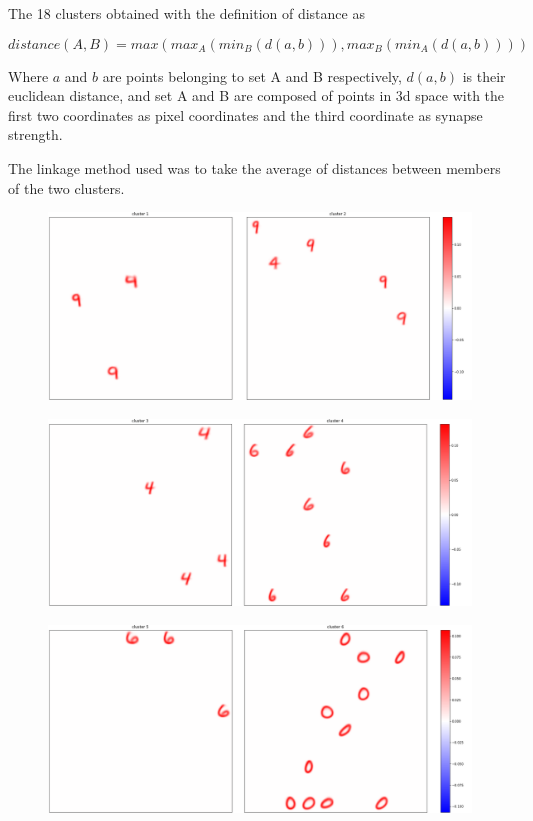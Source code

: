 \documentclass[a4paper]{report}
\begin{document}
The 18 clusters obtained with the definition of distance as

\begin{equation}
    distance(A, B) = max(max_A(min_B(d(a,b))), max_B(min_A(d(a,b))))
\end{equation}

Where $a$ and $b$ are points belonging to set A and B respectively, $d(a,b)$ is their euclidean distance, and set A and B are composed of points in 3d space with the first two coordinates as pixel coordinates and the third coordinate as synapse strength.

The linkage method used was to take the average of distances between members of the two clusters.

\begin{figure} [H]
    \centering
    \includegraphics [width=\textwidth ] {c/h/1.png}
    \caption{}
\end{figure}

\begin{figure} [H]
    \centering
    \includegraphics [width=\textwidth ] {c/h/3.png}
    \caption{}
\end{figure}

\begin{figure} [H]
    \centering
    \includegraphics [width=\textwidth ] {c/h/5.png}
    \caption{}
\end{figure}
\end{document}
